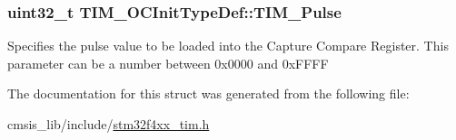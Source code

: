 \subsubsection[{\texorpdfstring{T\+I\+M\+\_\+\+Pulse}{TIM_Pulse}}]{\setlength{\rightskip}{0pt plus 5cm}uint32\+\_\+t T\+I\+M\+\_\+\+O\+C\+Init\+Type\+Def\+::\+T\+I\+M\+\_\+\+Pulse}\hypertarget{struct_t_i_m___o_c_init_type_def_ab4a2620c38029b136be560041173375d}{}\label{struct_t_i_m___o_c_init_type_def_ab4a2620c38029b136be560041173375d}
Specifies the pulse value to be loaded into the Capture Compare Register. This parameter can be a number between 0x0000 and 0x\+F\+F\+FF 

The documentation for this struct was generated from the following file\+:\begin{DoxyCompactItemize}
\item 
cmsis\+\_\+lib/include/\hyperlink{stm32f4xx__tim_8h}{stm32f4xx\+\_\+tim.\+h}\end{DoxyCompactItemize}
